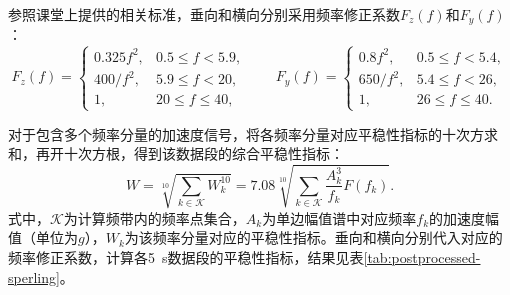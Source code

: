 \documentclass[12pt, oneside, a4paper]{ctexart}
\begin{document}
\par{}
参照课堂上提供的相关标准，垂向和横向分别采用频率修正系数$F_z(f)$和$F_y(f)$：
\begin{equation*}
    F_z(f)=
    \begin{cases}
        0.325f^2, & 0.5\leq f<5.9,  \\
        400/f^2,  & 5.9\leq f<20,   \\
        1,        & 20\leq f\leq40,
    \end{cases}
    \qquad
    F_y(f)=
    \begin{cases}
        0.8f^2,  & 0.5\leq f<5.4,  \\
        650/f^2, & 5.4\leq f<26,   \\
        1,       & 26\leq f\leq40.
    \end{cases}
\end{equation*}
\par{}
对于包含多个频率分量的加速度信号，将各频率分量对应平稳性指标的十次方求和，再开十次方根，得到该数据段的综合平稳性指标：
\begin{equation*}
    W=\sqrt[10]{\sum_{k\in\mathcal{K}}W_k^{10}}
    =7.08\sqrt[10]{
        \sum_{k\in\mathcal{K}}
        \frac{A_k^3}{f_k}F(f_k)
    }.
\end{equation*}
式中，$\mathcal{K}$为计算频带内的频率点集合，$A_k$为单边幅值谱中对应频率$f_k$的加速度幅值（单位为$g$），$W_k$为该频率分量对应的平稳性指标。垂向和横向分别代入对应的频率修正系数，计算各5~s数据段的平稳性指标，结果见表\ref{tab:postprocessed-sperling}。
\begingroup
\small
\renewcommand{\arraystretch}{1.3}
\setlength{\tabcolsep}{3pt}
\end{document}
